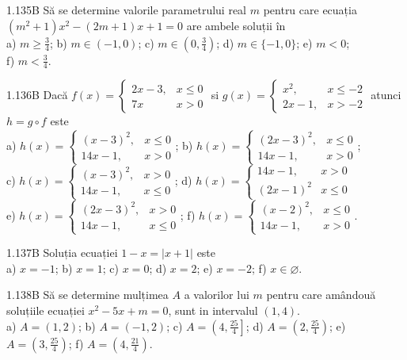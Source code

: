 \documentclass[11pt]{article}
\begin{document}
1.135B Să se determine valorile parametrului real $m$ pentru care ecuația $\left(m^{2}+1\right) x^{2}-(2 m+1) x+1=0$ are ambele soluții în\\ a) $m \geq \frac{3}{4}$; b) $m \in(-1,0)$; c) $m \in\left(0, \frac{3}{4}\right)$; d) $m \in\{-1,0\}$; e) $m<0$;\\ f) $m<\frac{3}{4}$.

1.136B Dacă $f(x)=\left\{\begin{array}{ll}2 x-3, & x \leq 0 \\ 7 x & x>0\end{array}\right.$ si $g(x)=\left\{\begin{array}{ll}x^{2}, & x \leq-2 \\ 2 x-1, & x>-2\end{array}\right.$ atunci $h=g \circ f$ este\\ a) $h(x)= \begin{cases}(x-3)^{2}, & x \leq 0 \\ 14 x-1, & x>0\end{cases}$; b) $h(x)=\left\{\begin{array}{ll}(2 x-3)^{2}, & x \leq 0 \\ 14 x-1, & x>0\end{array}\right.$;\\ c) $h(x)= \begin{cases}(x-3)^{2}, & x>0 \\ 14 x-1, & x \leq 0\end{cases}$; d) $h(x)= \begin{cases}14 x-1, & x>0 \\ (2 x-1)^{2} & x \leq 0\end{cases}$\\ e) $h(x)= \begin{cases} (2 x-3)^{2}, & x>0 \\ 14 x-1, & x \leq 0\end{cases}$; f) $h(x)= \begin{cases}(x-2)^{2}, & x \leq 0 \\ 14 x-1, & x>0\end{cases}$.

1.137B Soluția ecuației $1-x=|x+1|$ este\\ a) $x=-1$; b) $x=1$; c) $x=0$; d) $x=2$; e) $x=-2$; f) $x \in \varnothing$.

1.138B Să se determine mulțimea $A$ a valorilor lui $m$ pentru care amândouă soluțiile ecuației $x^{2}-5 x+m=0$, sunt in intervalul $(1,4)$.\\ a) $A=(1,2)$; b) $A=(-1,2)$; c) $A=\left(4, \frac{25}{4}\right]$; d) $A=\left(2, \frac{25}{4}\right)$; e) $A=\left(3, \frac{25}{4}\right)$; f) $A=\left(4, \frac{21}{4}\right)$.
\end{document}
